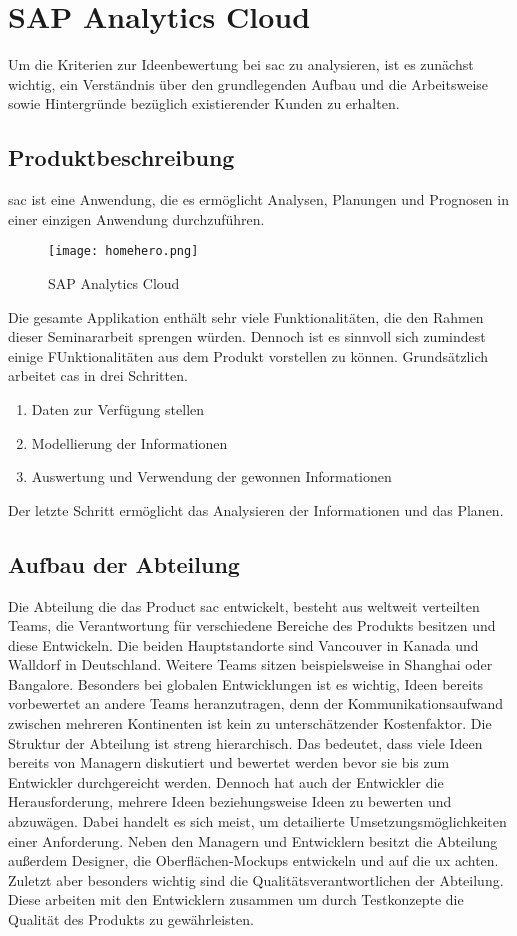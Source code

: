 \newpage
\section{SAP Analytics Cloud}\label{sec:sac}
Um die Kriterien zur Ideenbewertung bei \ac{sac} zu analysieren, ist es zunächst 
wichtig, ein Verständnis über den grundlegenden Aufbau und die Arbeitsweise sowie Hintergründe bezüglich 
existierender Kunden zu erhalten. 

\subsection{Produktbeschreibung}
\ac{sac} ist eine Anwendung, die es ermöglicht Analysen, Planungen und Prognosen in einer einzigen Anwendung durchzuführen. 
\begin{figure}[ht]
	\centering
	\texttt{[image: homehero.png]}
	\caption{SAP Analytics Cloud}
	\label{img:homeHeroSAC}
\end{figure}
Die gesamte Applikation enthält sehr viele Funktionalitäten, die den Rahmen dieser Seminararbeit sprengen würden. Dennoch ist
es sinnvoll sich zumindest einige FUnktionalitäten aus dem Produkt vorstellen zu können. 
Grundsätzlich arbeitet \ac{cas} in drei Schritten. 

\begin{enumerate}
    \item Daten zur Verfügung stellen
    \item Modellierung der Informationen
    \item Auswertung und Verwendung der gewonnen Informationen 
\end{enumerate}
Der letzte Schritt ermöglicht das Analysieren der Informationen und das Planen. 

\subsection{Aufbau der Abteilung}
Die Abteilung die das Product \ac{sac} entwickelt, besteht aus weltweit verteilten Teams, 
die Verantwortung für verschiedene Bereiche des Produkts besitzen und diese Entwickeln. 
Die beiden Hauptstandorte sind Vancouver in Kanada und Walldorf in Deutschland. Weitere Teams sitzen beispielsweise in 
Shanghai oder Bangalore. Besonders bei globalen Entwicklungen ist es wichtig, Ideen bereits vorbewertet an andere Teams 
heranzutragen, denn der Kommunikationsaufwand zwischen mehreren Kontinenten ist kein zu unterschätzender Kostenfaktor. 
Die Struktur der Abteilung ist streng hierarchisch. Das bedeutet, dass viele Ideen bereits von Managern diskutiert und 
bewertet werden bevor sie bis zum Entwickler durchgereicht werden. Dennoch hat auch der Entwickler die Herausforderung, 
mehrere Ideen beziehungsweise Ideen zu bewerten und abzuwägen. Dabei handelt es sich meist, um detailierte Umsetzungsmöglichkeiten
einer Anforderung. 
Neben den Managern und Entwicklern besitzt die Abteilung außerdem Designer, die Oberflächen-Mockups entwickeln und auf
die \ac{ux} achten. Zuletzt aber besonders wichtig sind die Qualitätsverantwortlichen der Abteilung. Diese 
arbeiten mit den Entwicklern zusammen um durch Testkonzepte die Qualität des Produkts zu gewährleisten.

